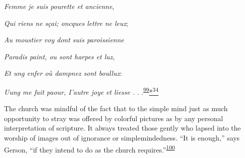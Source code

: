 \emph{Femme je suis pourette et ancienne},

\emph{Qui riens ne sçai; oncques lettre ne leuz};

\emph{Au moustier voy dont suis paroissienne}

\emph{Paradis paint, ou sont harpes et luz},

\emph{Et ung enfer où dampnez sont boulluz}:

\emph{Uung me fait paour, I'autre joye et liesse .} .
.\textsuperscript{\protect\hypertarget{13_Chapter_Six__THE_DEPICTION_OF_TH.xhtmlux5cux23id_1074}{\protect\hyperlink{23_NOTES.xhtmlux5cux23id_1075}{99}}}\protect\hypertarget{13_Chapter_Six__THE_DEPICTION_OF_TH.xhtmlux5cux23id_3055}{\protect\hyperlink{23_NOTES.xhtmlux5cux23id_3056}{*\textsuperscript{34}}}

The church was mindful of the fact that to the simple mind just as much
opportunity to stray was offered by colorful pictures as by any personal
interpretation of scripture. It always treated those gently who lapsed
into the worship of images out of ignorance or simplemindedness. ``It is
enough,'' says Gerson, ``if they intend to do as the church
requires.''\textsuperscript{\protect\hypertarget{13_Chapter_Six__THE_DEPICTION_OF_TH.xhtmlux5cux23id_1072}{\protect\hyperlink{23_NOTES.xhtmlux5cux23id_1073}{100}}}


